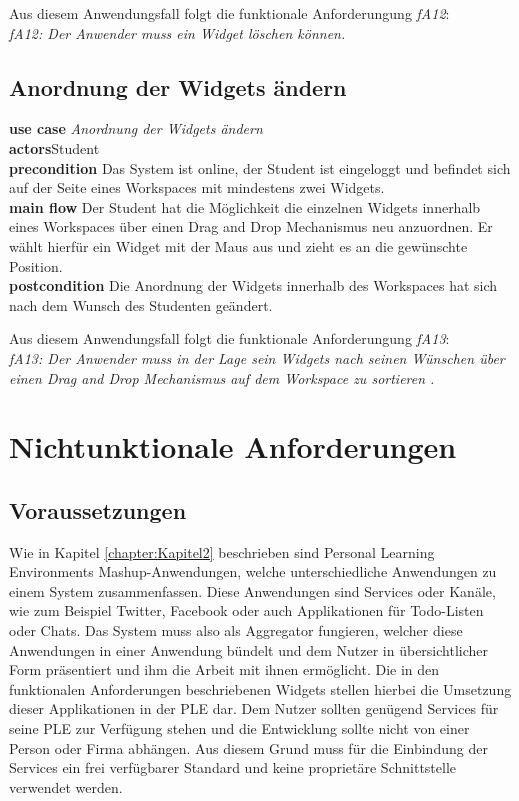 Aus diesem Anwendungsfall folgt die funktionale Anforderungung \emph{fA12}:\\
\emph{fA12: Der Anwender muss ein Widget löschen können.}\\
 
\subsection{Anordnung der Widgets ändern}
\textbf{use case} \emph{Anordnung der Widgets ändern}\\
\textbf{actors}Student\\
\textbf{precondition} Das System ist online, der Student ist eingeloggt und befindet sich auf der Seite eines Workspaces mit mindestens zwei Widgets.\\
\textbf{main flow} Der Student hat die Möglichkeit die einzelnen Widgets innerhalb eines Workspaces über einen Drag and Drop Mechanismus neu anzuordnen. Er wählt hierfür ein Widget mit der Maus aus und zieht es an die gewünschte Position.\\
\textbf{postcondition} Die Anordnung der Widgets innerhalb des Workspaces hat sich nach dem Wunsch des Studenten geändert.
 
Aus diesem Anwendungsfall folgt die funktionale Anforderungung \emph{fA13}:\\
\emph{fA13: Der Anwender muss in der Lage sein Widgets nach seinen Wünschen über einen Drag and Drop Mechanismus auf dem Workspace zu sortieren .}\\
 
\section{Nichtunktionale Anforderungen}\label{section:nichtfunktionale_anforderunge}

\subsection{Voraussetzungen}
Wie in Kapitel \ref{chapter:Kapitel2} beschrieben sind Personal Learning Environments Mashup-Anwendungen, welche unterschiedliche Anwendungen zu einem System zusammenfassen. Diese Anwendungen sind Services oder Kanäle, wie zum Beispiel Twitter, Facebook oder auch Applikationen für Todo-Listen oder Chats. Das System muss also als Aggregator fungieren, welcher diese Anwendungen in einer Anwendung bündelt und dem Nutzer in übersichtlicher Form präsentiert und ihm die Arbeit mit ihnen ermöglicht. Die in den funktionalen Anforderungen beschriebenen Widgets stellen hierbei die Umsetzung dieser Applikationen in der PLE dar. Dem Nutzer sollten genügend Services für seine PLE zur Verfügung stehen und die Entwicklung sollte nicht von einer Person oder Firma abhängen. Aus diesem Grund muss für die Einbindung der Services ein frei verfügbarer Standard und keine proprietäre Schnittstelle verwendet werden.

